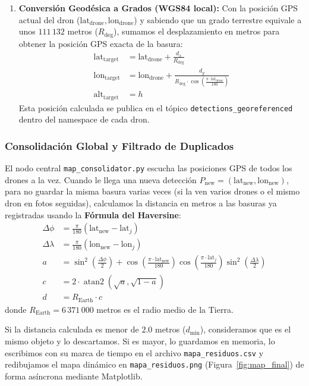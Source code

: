 \documentclass[11pt,a4paper]{article}
\begin{document}
\begin{enumerate}
    \item \textbf{Conversión Geodésica a Grados (WGS84 local):}
    Con la posición GPS actual del dron ($\text{lat}_{\text{drone}}, \text{lon}_{\text{drone}}$) y sabiendo que un grado terrestre equivale a unos $111\,132$ metros ($R_{\text{deg}}$), sumamos el desplazamiento en metros para obtener la posición GPS exacta de la basura:
    \begin{align}
    \text{lat}_{\text{target}} &= \text{lat}_{\text{drone}} + \frac{d_x}{R_{\text{deg}}} \\
    \text{lon}_{\text{target}} &= \text{lon}_{\text{drone}} + \frac{d_y}{R_{\text{deg}} \cdot \cos\left(\frac{\pi \cdot \text{lat}_{\text{drone}}}{180}\right)}
    \\
    \text{alt}_{\text{target}} &= h
    \end{align}
    Esta posición calculada se publica en el tópico \texttt{detections\_georeferenced} dentro del namespace de cada dron.
\end{enumerate}

\subsubsection{Consolidación Global y Filtrado de Duplicados}
El nodo central \texttt{map\_}\allowbreak\texttt{consolidator.py} escucha las posiciones GPS de todos los drones a la vez. Cuando le llega una nueva detección $P_{\text{new}} = (\text{lat}_{\text{new}}, \text{lon}_{\text{new}})$, para no guardar la misma basura varias veces (si la ven varios drones o el mismo dron en fotos seguidas), calculamos la distancia en metros a las basuras ya registradas usando la \textbf{Fórmula del Haversine}:
\begin{align}
\Delta \phi &= \frac{\pi}{180} (\text{lat}_{\text{new}} - \text{lat}_j) \\
\Delta \lambda &= \frac{\pi}{180} (\text{lon}_{\text{new}} - \text{lon}_j) \\
a &= \sin^2\left(\frac{\Delta \phi}{2}\right) + \cos\left(\frac{\pi \cdot \text{lat}_{\text{new}}}{180}\right)\cos\left(\frac{\pi \cdot \text{lat}_j}{180}\right)\sin^2\left(\frac{\Delta \lambda}{2}\right) \\
c &= 2 \cdot \operatorname{atan2}\left(\sqrt{a}, \sqrt{1-a}\right) \\
d &= R_{\text{Earth}} \cdot c
\end{align}
donde $R_{\text{Earth}} = 6\,371\,000$ metros es el radio medio de la Tierra.

Si la distancia calculada es menor de $2.0$ metros ($d_{\text{min}}$), consideramos que es el mismo objeto y lo descartamos. Si es mayor, lo guardamos en memoria, lo escribimos con su marca de tiempo en el archivo \texttt{mapa\_residuos.csv} y redibujamos el mapa dinámico en \texttt{mapa\_residuos.png} (Figura~\ref{fig:map_final}) de forma asíncrona mediante Matplotlib.
\end{document}
